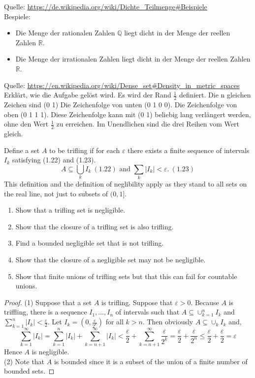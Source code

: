 \documentclass[11pt]{article}
\newcommand{\seq}{\subseteq}
\newcommand{\e}{\varepsilon}
\newcommand{\un}{\cup}
\newenvironment{exercise}[2][Exercise]{\begin{trivlist}
\item[\hskip \labelsep {\bfseries #1}\hskip \labelsep {\bfseries #2.}]}{\end{trivlist}}
\newenvironment{reflection}[2][Reflection]{\begin{trivlist}
\item[\hskip \labelsep {\bfseries #1}\hskip \labelsep {\bfseries #2.}]}{\end{trivlist}}
\begin{document}
\begin{reflection}{1.2}
Quelle: 
\url{https://de.wikipedia.org/wiki/Dichte_Teilmenge#Beispiele}\\
Bespiele:
\begin{itemize}
\item  Die Menge der rationalen Zahlen $\mathbb{Q}$ liegt dicht in der Menge der reellen Zahlen $\mathbb{R}$.
\item  Die Menge der irrationalen Zahlen liegt dicht in der Menge der reellen Zahlen $\mathbb{R}$.
\end{itemize}

Quelle: 
\url{https://en.wikipedia.org/wiki/Dense_set#Density_in_metric_spaces}\\
Erklärt, wie die Aufgabe gelöst wird.
Es wird der Rand $\frac{1}{2}$ definiert. Die n gleichen Zeichen sind (0 1)
Die Zeichenfolge von unten (0 1 0 0). Die Zeichenfolge von oben (0 1 1 1). Diese Zeichenfolge kann mit (0 1) beliebig lang verlängert werden, ohne den Wert $\frac{1}{2}$ zu erreichen. 
Im Unendlichen sind die drei Reihen vom Wert gleich.
\end{reflection}

\begin{exercise}{1.3}
    Define a set $A$ to be trifling if for each $\e$ there exists a finite sequence of intervals $I_k$ satisfying (1.22) and (1.23).
    \[ A \seq \bigcup_{k} I_k \ (1.22) \text { and } \sum_{k} |I_k| < \e. \ (1.23) \]
    This definition and the definition of neglibility apply as they stand to all sets on the real line, not just to subsets of $(0, 1]$.
    \begin{enumerate}
        \item Show that a trifling set is negligible.
        \item Show that the closure of a trifling set is also trifling.
        \item Find a bounded negligible set that is not trifling.
        \item Show that the closure of a negligible set may not be negligible.
        \item Show that finite unions of trifling sets but that this can fail for countable unions.
    \end{enumerate}
\end{exercise}
\begin{proof}
    (1) Suppose that a set $A$ is trifling. Suppose that $\e > 0$. Because $A$ is triffling, there is a sequence $I_1, \ldots, I_n$ of intervals such that $A \seq \un_{k=1}^{n} I_k$ and $\sum_{k=1}^{n} |I_k| < \frac{\e}{2}$. Let $I_{k} = (0, \frac{\e}{2^{k}})$ for all $k > n$. Then obviously $A \seq \un_{k} I_k$ and,
    \[ \sum_{k=1}^{\infty} |I_k| = \sum_{k=1}^{n} |I_k| + \sum_{k=n+1}^{\infty} |I_k| < \frac{\e}{2}  + \sum_{k=n+1}^{\infty} \frac{\e}{2^{k}} = \frac{\e}{2} + \frac{\e}{2^{n}}  \leq \frac{\e}{2} + \frac{\e}{2} = \e    \]
    Hence $A$ is negligible. \\
    (2) Note that $A$ is bounded since it is a subset of the union of a finite number of bounded sets. 
\end{proof}
\end{document}
